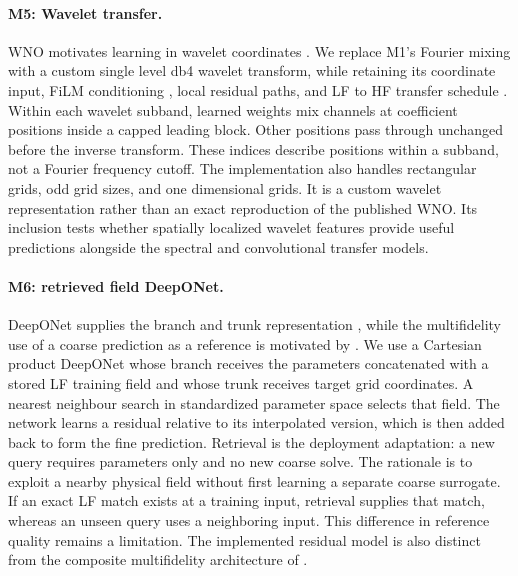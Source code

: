 \paragraph{M5: Wavelet transfer.}
WNO motivates learning in wavelet coordinates \citep{tripura2022wno}. We
replace M1's Fourier mixing with a custom single level db4 wavelet transform,
while retaining its coordinate input, FiLM conditioning \citep{perez2018},
local residual paths, and LF to HF transfer schedule \citep{lyu2023}. Within
each wavelet subband, learned weights mix channels at coefficient positions
inside a capped leading block. Other positions pass through unchanged before
the inverse transform. These indices describe positions within a subband,
not a Fourier frequency cutoff. The implementation also handles rectangular
grids, odd grid sizes, and one dimensional grids. It is a custom wavelet
representation rather than an exact reproduction of the published WNO.
Its inclusion tests whether spatially localized wavelet features provide useful
predictions alongside the spectral and convolutional transfer models.

\paragraph{M6: retrieved field DeepONet.}
DeepONet supplies the branch and trunk representation \citep{lu2021}, while
the multifidelity use of a coarse prediction as a reference is motivated by
\citet{lu2022mf}. We use a Cartesian product DeepONet whose branch receives
the parameters concatenated with a stored LF training field and whose trunk
receives target grid coordinates. A nearest neighbour search in standardized
parameter space selects that field. The network learns a residual relative to
its interpolated version, which is then added back to form the fine prediction.
Retrieval is the deployment adaptation: a new query requires parameters only
and no new coarse solve. The rationale is to exploit a nearby physical field
without first learning a separate coarse surrogate. If an exact LF match exists
at a training input, retrieval supplies that match, whereas an unseen query
uses a neighboring input. This difference in reference quality remains a
limitation. The implemented residual model is also distinct from the composite
multifidelity architecture of \citet{howard2023}.

